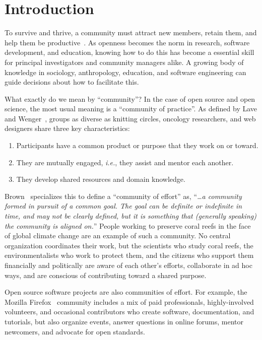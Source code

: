 \documentclass[10pt,letterpaper]{article}
\begin{document}
\section*{Introduction}

To survive and thrive,
a community must attract new members,
retain them,
and help them be productive~\cite{qureshi2011}.
As openness becomes the norm in research, software development, and education,
knowing how to do this has become a essential skill
for principal investigators and community managers alike.
A growing body of knowledge in sociology, anthropology, education, and software engineering
can guide decisions about how to facilitate this.

What exactly do we mean by ``community''?
In the case of open source and open science,
the most usual meaning is a ``community of practice''.
As defined by Lave and Wenger~\cite{lave1991,wenger1999},
groups as diverse as knitting circles, oncology researchers, and web designers
share three key characteristics:

\begin{enumerate}

\item Participants have a common product or purpose that they work on or toward.

\item They are mutually engaged, \textit{i.e.}, they assist and mentor each another.

\item They develop shared resources and domain knowledge.

\end{enumerate}

Brown~\cite{brown2019} specializes this to define a ``community of effort'' as,
``\textit{{\ldots}a community formed in pursuit of a common goal.
The goal can be definite or indefinite in time,
and may not be clearly defined,
but it is something that (generally speaking) the community is aligned on.}''
People working to preserve coral reefs in the face of global climate change
are an example of such a community.
No central organization coordinates their work,
but the scientists who study coral reefs,
the environmentalists who work to protect them,
and the citizens who support them financially and politically
are aware of each other's efforts,
collaborate in ad hoc ways,
and are conscious of contributing toward a shared purpose.

Open source software projects are also communities of effort.
For example,
the Mozilla Firefox~\cite{mozilla} community includes a mix of paid professionals,
highly-involved volunteers,
and occasional contributors who create software,
documentation,
and tutorials,
but also organize events,
answer questions in online forums,
mentor newcomers,
and advocate for open standards.
\end{document}
